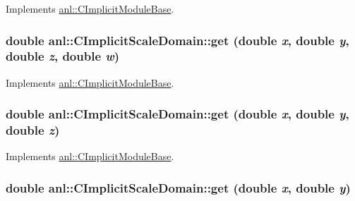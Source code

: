 Implements \hyperlink{classanl_1_1CImplicitModuleBase_aa40b7d54572197612a4fea44b63447eb}{anl::CImplicitModuleBase}.\hypertarget{classanl_1_1CImplicitScaleDomain_af53d0c59728d29e9b8cd21b581030b24}{
\subsubsection[{get}]{\setlength{\rightskip}{0pt plus 5cm}double anl::CImplicitScaleDomain::get (double {\em x}, \/  double {\em y}, \/  double {\em z}, \/  double {\em w})}}
\label{classanl_1_1CImplicitScaleDomain_af53d0c59728d29e9b8cd21b581030b24}


Implements \hyperlink{classanl_1_1CImplicitModuleBase_a3cf520bdab59631864253c03b4e1723f}{anl::CImplicitModuleBase}.\hypertarget{classanl_1_1CImplicitScaleDomain_a7dfe0c88e39f22949a8233e60d0bf70c}{
\subsubsection[{get}]{\setlength{\rightskip}{0pt plus 5cm}double anl::CImplicitScaleDomain::get (double {\em x}, \/  double {\em y}, \/  double {\em z})}}
\label{classanl_1_1CImplicitScaleDomain_a7dfe0c88e39f22949a8233e60d0bf70c}


Implements \hyperlink{classanl_1_1CImplicitModuleBase_ac17d592612c82ba3d47f9229a00b1fe3}{anl::CImplicitModuleBase}.\hypertarget{classanl_1_1CImplicitScaleDomain_a9f4a9bc6d4cf2af9209123423b83feec}{
\subsubsection[{get}]{\setlength{\rightskip}{0pt plus 5cm}double anl::CImplicitScaleDomain::get (double {\em x}, \/  double {\em y})}}
\label{classanl_1_1CImplicitScaleDomain_a9f4a9bc6d4cf2af9209123423b83feec}


